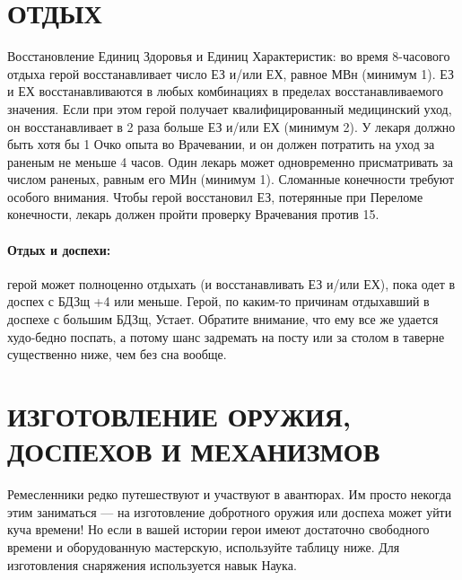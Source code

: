 \section{ОТДЫХ}
Восстановление Единиц Здоровья и Единиц Характеристик: во время 8-часового отдыха герой восстанавливает число ЕЗ и/или ЕХ, равное МВн (минимум 1). ЕЗ и ЕХ восстанавливаются в любых комбинациях в пределах восстанавливаемого значения. Если при этом герой получает квалифицированный медицинский уход, он восстанавливает в 2 раза больше ЕЗ и/или ЕХ (минимум 2). У лекаря должно быть хотя бы 1 Очко опыта во Врачевании, и он должен потратить на уход за раненым не меньше 4 часов. Один лекарь может одновременно присматривать за числом раненых, равным его МИн (минимум 1).
Сломанные конечности требуют особого внимания. Чтобы герой восстановил ЕЗ, потерянные при Переломе конечности, лекарь должен пройти проверку Врачевания против 15.
\paragraph{Отдых и доспехи:} герой может полноценно отдыхать (и восстанавливать ЕЗ и/или ЕХ), пока одет в доспех с БДЗщ +4 или меньше. Герой, по каким-то причинам отдыхавший в доспехе с большим БДЗщ, Устает. Обратите внимание, что ему все же удается худо-бедно поспать, а потому шанс задремать на посту или за столом в таверне существенно ниже, чем без сна вообще.
\section{ИЗГОТОВЛЕНИЕ ОРУЖИЯ, ДОСПЕХОВ И МЕХАНИЗМОВ}
Ремесленники редко путешествуют и участвуют в авантюрах. Им просто некогда этим заниматься — на изготовление добротного оружия или доспеха может уйти куча времени! Но если в вашей истории герои имеют достаточно свободного времени и оборудованную мастерскую, используйте таблицу ниже. Для изготовления снаряжения используется навык Наука.

